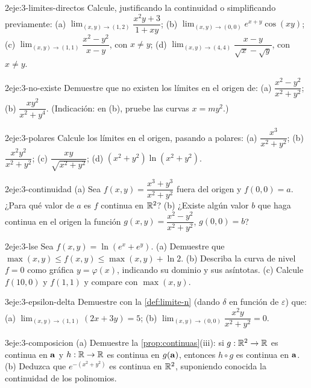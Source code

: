 \begin{ejercicio}{2}{eje:3-limites-directos}
Calcule, justificando la continuidad o simplificando previamente: (a) $\lim_{(x,y)\to(1,2)}\dfrac{x^2y+3}{1+xy}$; (b) $\lim_{(x,y)\to(0,0)}e^{x+y}\cos(xy)$; (c) $\lim_{(x,y)\to(1,1)}\dfrac{x^2-y^2}{x-y}$, con $x\neq y$; (d) $\lim_{(x,y)\to(4,4)}\dfrac{x-y}{\sqrt x-\sqrt y}$, con $x\neq y$.
\end{ejercicio}

\begin{ejercicio}{2}{eje:3-no-existe}
Demuestre que no existen los límites en el origen de: (a) $\dfrac{x^2-y^2}{x^2+y^2}$; (b) $\dfrac{xy^2}{x^2+y^4}$. (Indicación: en (b), pruebe las curvas $x=my^2$.)
\end{ejercicio}

\begin{ejercicio}{2}{eje:3-polares}
Calcule los límites en el origen, pasando a polares: (a) $\dfrac{x^3}{x^2+y^2}$; (b) $\dfrac{x^2y^2}{x^2+y^2}$; (c) $\dfrac{xy}{\sqrt{x^2+y^2}}$; (d) $(x^2+y^2)\ln(x^2+y^2)$.
\end{ejercicio}

\begin{ejercicio}{2}{eje:3-continuidad}
(a) Sea $f(x,y)=\dfrac{x^3+y^3}{x^2+y^2}$ fuera del origen y $f(0,0)=a$. ¿Para qué valor de $a$ es $f$ continua en $\mathbb{R}^2$? (b) ¿Existe algún valor $b$ que haga continua en el origen la función $g(x,y)=\dfrac{x^2-y^2}{x^2+y^2}$, $g(0,0)=b$?
\end{ejercicio}

\begin{ejercicio}{2}{eje:3-lse}
Sea $f(x,y)=\ln(e^x+e^y)$. (a) Demuestre que $\max(x,y)\le f(x,y)\le\max(x,y)+\ln2$. (b) Describa la curva de nivel $f=0$ como gráfica $y=\varphi(x)$, indicando su dominio y sus asíntotas. (c) Calcule $f(10,0)$ y $f(1,1)$ y compare con $\max(x,y)$.
\end{ejercicio}

\begin{ejercicio}{3}{eje:3-epsilon-delta}
Demuestre con la \cref{def:limite-n} (dando $\delta$ en función de $\varepsilon$) que: (a) $\lim_{(x,y)\to(1,1)}(2x+3y)=5$; (b) $\lim_{(x,y)\to(0,0)}\dfrac{x^2y}{x^2+y^2}=0$.
\end{ejercicio}

\begin{ejercicio}{3}{eje:3-composicion}
(a) Demuestre la \cref{prop:continuas}(iii): si $g:\mathbb{R}^2\to\mathbb{R}$ es continua en $\mathbf{a}$ y $h:\mathbb{R}\to\mathbb{R}$ es continua en $g(\mathbf{a})$, entonces $h\circ g$ es continua en $\mathbf{a}$. (b) Deduzca que $e^{-(x^2+y^2)}$ es continua en $\mathbb{R}^2$, suponiendo conocida la continuidad de los polinomios.
\end{ejercicio}


